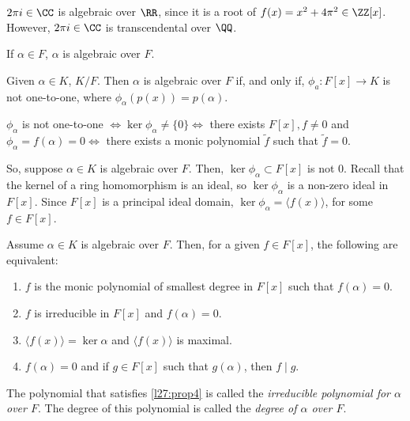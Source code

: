 \begin{exmp}
	$2\pi i \in \CC$ is algebraic over $\RR$, since it is a root of $f(x) = x^2 + 4\pi^2 \in \ZZ[x]$.
	However, $2\pi i \in \CC$ is transcendental over $\QQ$.
\end{exmp}

\begin{exmp}
	If $\alpha \in F$, $\alpha$ is algebraic over $F$.
\end{exmp}

\begin{lem}
	Given $\alpha \in K$, $K / F$. Then $\alpha$ is algebraic over $F$ if, and only if, $\phi_a: F[x] \to K$ is not one-to-one, where  $\phi_\alpha(p(x)) = p(\alpha)$.
\end{lem}

\begin{dem}
	$\phi_\alpha$ is not one-to-one $\iff \ker\phi_\alpha \neq \{0\} \iff$ there exists $F[x], f \neq 0$ and $\phi_\alpha = f(\alpha) = 0 \iff$ there exists a monic polynomial $\tilde f$ such that $\tilde f = 0$.
\end{dem}

So, suppose $\alpha \in K$ is algebraic over $F$. Then, $\ker\phi_\alpha \subset F[x]$ is not $0$. Recall that the kernel of a ring homomorphism is an ideal, so $\ker\phi_\alpha$ is a non-zero ideal in $F[x]$. Since $F[x]$ is a principal ideal domain,  $\ker\phi_\alpha = \langle f(x) \rangle$, for some $f \in F[x]$.

\begin{prop}\label{l27:prop4}
	Assume $\alpha \in K$ is algebraic over $F$. Then, for a given $f \in F[x]$, the following are equivalent:
	\begin{enumerate}
		\item $f$ is the monic polynomial of smallest degree in  $F[x]$ such that  $f(\alpha) = 0$.
		\item $f$ is irreducible in $F[x]$ and $f(\alpha) = 0$.
		\item $ \langle f(x) \rangle = \ker \alpha$ and $ \langle f(x) \rangle$ is maximal.
		\item $f(\alpha) = 0$ and if $g \in F[x]$ such that $g(\alpha)$, then $f \mid g$.
	\end{enumerate}
\end{prop}

\begin{defn}
	The polynomial that satisfies \cref{l27:prop4} is called the \emph{irreducible polynomial for $\alpha$ over $F$}. The degree of this polynomial is called the \emph{degree of $\alpha$ over $F$}.
\end{defn}
